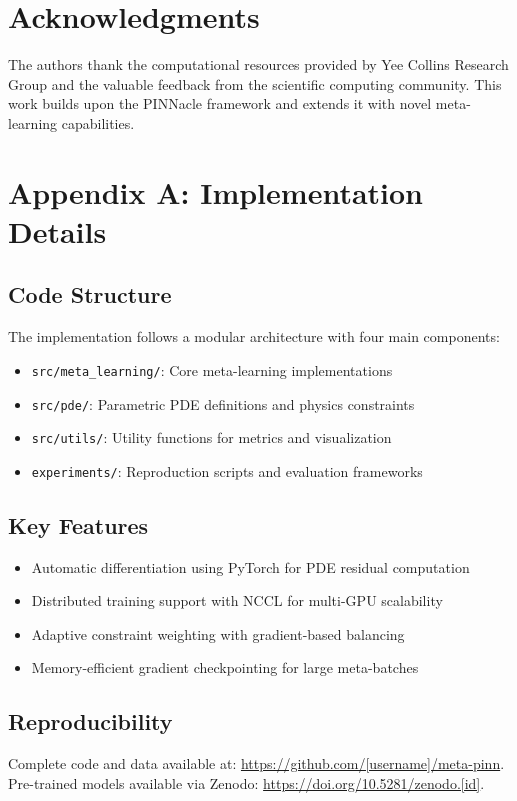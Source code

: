 \documentclass[review]{elsarticle}
\begin{document}
\section*{Acknowledgments}

The authors thank the computational resources provided by Yee Collins Research Group and the valuable feedback from the scientific computing community. This work builds upon the PINNacle framework and extends it with novel meta-learning capabilities.

\section{Appendix A: Implementation Details}

\subsection{Code Structure}
The implementation follows a modular architecture with four main components:
\begin{itemize}
\item \texttt{src/meta\_learning/}: Core meta-learning implementations
\item \texttt{src/pde/}: Parametric PDE definitions and physics constraints  
\item \texttt{src/utils/}: Utility functions for metrics and visualization
\item \texttt{experiments/}: Reproduction scripts and evaluation frameworks
\end{itemize}

\subsection{Key Features}
\begin{itemize}
\item Automatic differentiation using PyTorch for PDE residual computation
\item Distributed training support with NCCL for multi-GPU scalability
\item Adaptive constraint weighting with gradient-based balancing
\item Memory-efficient gradient checkpointing for large meta-batches
\end{itemize}

\subsection{Reproducibility}
Complete code and data available at: \url{https://github.com/[username]/meta-pinn}. 
Pre-trained models available via Zenodo: \url{https://doi.org/10.5281/zenodo.[id]}.
\end{document}
